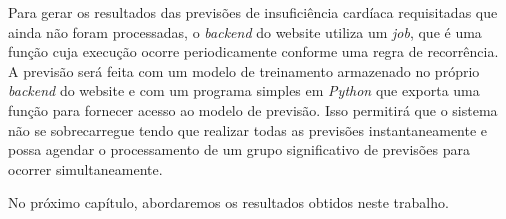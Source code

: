 Para gerar os resultados das previsões de insuficiência cardíaca requisitadas que ainda não foram processadas, o \textit{backend} do website utiliza um \textit{job}, que é uma função cuja execução ocorre periodicamente conforme uma regra de recorrência. A previsão será feita com um modelo de treinamento armazenado no próprio \textit{backend} do website e com um programa simples em \textit{Python} que exporta uma função para fornecer acesso ao modelo de previsão. Isso permitirá que o sistema não se sobrecarregue tendo que realizar todas as previsões instantaneamente e possa agendar o processamento de um grupo significativo de previsões para ocorrer simultaneamente.

No próximo capítulo, abordaremos os resultados obtidos neste trabalho.
